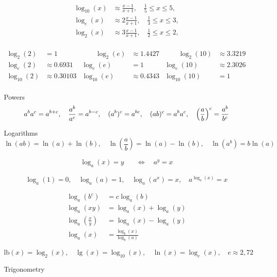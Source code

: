 \documentclass[12pt]{article}
\begin{document}
\begin{equation*}
\begin{split}
\log_{10}(x)&\approx\frac{x-1}{x+1},\quad\frac{1}{5}\leq x\leq 5,\\
\log_{e}(x)&\approx 2\frac{x-1}{x+1},\quad\frac{1}{3}\leq x\leq 3,\\
\log_{2}(x)&\approx 3\frac{x-1}{x+1},\quad\frac{1}{2}\leq x\leq 2,\\
\end{split}
\end{equation*}

\(
\begin{array}{rlrlrl}
\log_2(2)&=1 &\qquad \log_2(e)&\approx 1.4427 &\qquad \log_2(10)&\approx 3.3219\\
\log_e(2)&\approx 0.6931 & \log_e(e)&=1 & \log_e(10)&\approx 2.3026\\
\log_{10}(2)&\approx 0.30103 & \log_{10}(e)&\approx 0.4343 & \log_{10}(10)&=1\\
\end{array}
\)
\vspace{5mm}

Powers
$$
a^ba^c=a^{b+c},\quad 
\frac{a^b}{a^c}=a^{b-c},\quad 
(a^b)^c=a^{bc},\quad 
(ab)^c=a^ba^c,\quad 
\left(\frac{a}{b}\right)^c=\frac{a^b}{b^c}
$$

Logarithms
$$
\ln(ab)=\ln(a)+\ln(b),\quad
\ln(\frac{a}{b})=\ln(a)-\ln(b),\quad
\ln(a^b)=b\ln(a)
$$


\begin{equation*}
\begin{split}
\log_a(x)=y\quad&\Leftrightarrow\quad a^y=x
\end{split}
\end{equation*}


$$
\log_a(1)=0,\quad
\log_a(a)=1,\quad
\log_a(a^x)=x,\quad
a^{\log_a(x)}=x
$$

\begin{equation*}
\begin{split}
\log_a(b^c)&=c\log_a(b)\\
\log_a(xy)&=\log_a(x)+\log_a(y)\\
\log_a\left(\frac{x}{y}\right)
&=\log_a(x)-\log_a(y)\\
\log_a(x)&=\frac{\log_b(x)}{\log_b(a)}
\end{split}
\end{equation*}

$$
\textrm{lb}(x)=\log_2(x),\quad
\lg(x)=\log_{10}(x),\quad
\ln(x)=\log_e(x),\quad
e\approx 2,72
$$

Trigonometry
\end{document}
